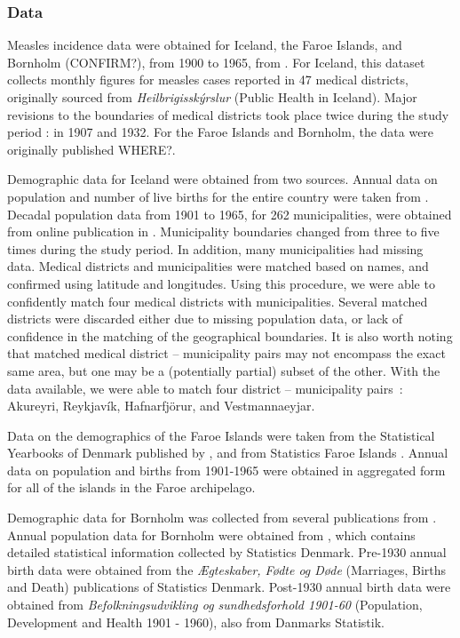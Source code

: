 \documentclass[10pt]{article}
\begin{document}
\subsubsection*{Data}

Measles incidence data were obtained for Iceland, the Faroe Islands, and Bornholm (CONFIRM?), from 1900 to 1965, from \cite{Cliff1981}. For Iceland, this dataset collects monthly figures for measles cases reported in 47 medical districts, originally sourced from \textit{Heilbrig\dh{}issk\'{y}rslur} (Public Health in Iceland). Major revisions to the boundaries of medical districts took place twice during the study period : in 1907 and 1932. For the Faroe Islands and Bornholm, the data were originally published WHERE?. 

Demographic data for Iceland were obtained from two sources. Annual data on population and number of live births for the entire country were taken from \cite{Cliff1983B}. Decadal population data from 1901 to 1965, for 262 municipalities, were obtained from online publication in \cite{StatsIceland}. Municipality boundaries changed from three to five times during the study period. In addition, many municipalities had missing data. Medical districts and municipalities were matched based on names, and confirmed using latitude and longitudes. Using this procedure, we were able to confidently match four medical districts with municipalities. Several matched districts were discarded either due to missing population data, or lack of confidence in the matching of the geographical boundaries. It is also worth noting that matched medical district -- municipality pairs may not encompass the exact same area, but one may be a (potentially partial) subset of the other. With the data available, we were able to match four district -- municipality pairs~: Akureyri, Reykjav\'{i}k, Hafnarfj\"{o}r\dh{}ur, and Vestmannaeyjar.

Data on the demographics of the Faroe Islands were taken from the Statistical Yearbooks of Denmark published by \cite{StatsDenmark}, and from Statistics Faroe Islands \cite{StatsFaroe}. Annual data on population and births from 1901-1965 were obtained in aggregated form for all of the islands in the Faroe archipelago. 

Demographic data for Bornholm was collected from several publications from \cite{StatsDenmark}. Annual population data for Bornholm were obtained from \cite{StatsDenmark}, which contains detailed statistical information collected by Statistics Denmark. Pre-1930 annual birth data were obtained from the \textit{\AE{}gteskaber, F\o{}dte og D\o{}de} (Marriages, Births and Death) publications of Statistics Denmark. Post-1930 annual birth data were obtained from \textit{Befolkningsudvikling og sundhedsforhold 1901-60} (Population, Development and Health 1901 - 1960), also from Danmarks Statistik.
\end{document}
